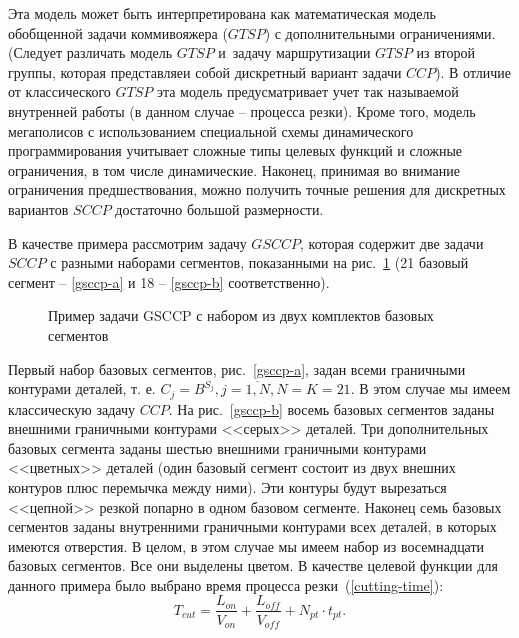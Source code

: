 \documentclass[11pt,twoside,openany]{report}
\begin{document}
Эта модель может быть интерпретирована
как математическая модель обобщенной задачи коммивояжера ($GTSP$)
с дополнительными ограничениями.
(Следует различать модель $GTSP$
и~задачу маршрутизации $GTSP$ из второй группы,
которая представляеи собой дискретный вариант задачи $CCP$).
В отличие от классического $GTSP$ эта модель
предусматривает учет так называемой внутренней работы
(в данном случае -- процесса резки).
Кроме того, модель мегаполисов с
использованием специальной схемы динамического программирования
учитывает сложные типы целевых функций и сложные ограничения,
в том числе динамические.
Наконец, принимая во внимание ограничения предшествования,
можно получить точные решения для дискретных вариантов $SCCP$
достаточно большой размерности.

В качестве примера рассмотрим задачу $GSCCP$,
которая содержит две
задачи $SCCP$ с разными наборами сегментов,
показанными на рис.~\ref{gsccp-both}
(21 базовый сегмент -- \ref{gsccp-a}
и 18 -- \ref{gsccp-b} соответственно).

\begin{figure}[h]
  \centering
  \caption{Пример задачи GSCCP с набором из двух комплектов базовых сегментов}
  \label{gsccp-both}
\end{figure}

Первый набор базовых сегментов,
рис.~\ref{gsccp-a},
задан всеми граничными контурами деталей, т. е.
$C_j = B^{S_j}, j=\overline{1,N}, N=K=21$.
В этом случае мы имеем классическую задачу $CCP$.
На рис.~\ref{gsccp-b} восемь
базовых сегментов заданы внешними граничными контурами <<серых>> деталей.
Три дополнительных базовых сегмента заданы шестью
внешними граничными контурами <<цветных>> деталей
(один базовый сегмент состоит из двух внешних контуров плюс перемычка между ними).
Эти контуры будут вырезаться <<цепной>> резкой попарно в одном базовом сегменте.
Наконец семь базовых сегментов заданы внутренними
граничными контурами всех деталей,
в которых имеются отверстия.
В целом, в этом случае мы имеем набор из восемнадцати
базовых сегментов.
Все они выделены цветом.
В качестве целевой функции для данного примера было выбрано
время процесса резки~(\ref{cutting-time}):
$$
  T_{cut} = \frac{L_{on}}{V_{on}} + \frac{L_{off}}{V_{off}} +N_{pt} \cdot t_{pt}
  .
$$
\end{document}
